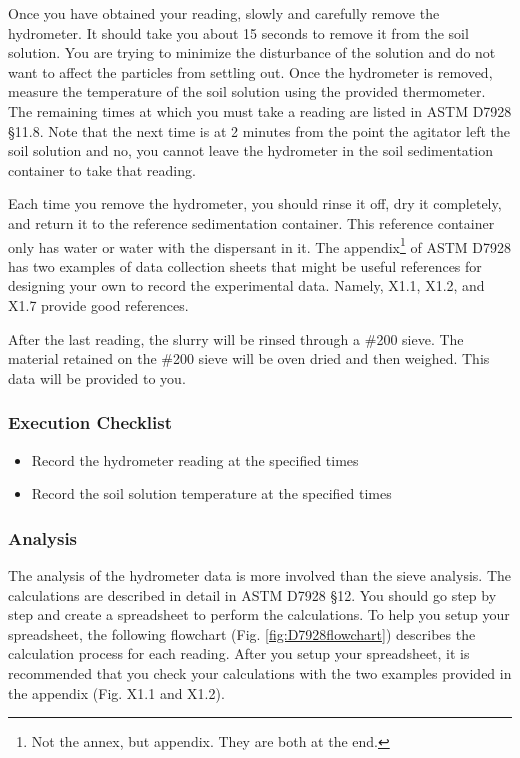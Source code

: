 \documentclass[12pt]{article}
\begin{document}
Once you have obtained your reading, slowly and carefully remove the hydrometer. It should take you about 15 seconds to remove it from the soil solution. You are trying to minimize the disturbance of the solution and do not want to affect the particles from settling out. Once the hydrometer is removed, measure the temperature of the soil solution using the provided thermometer. The remaining times at which you must take a reading are listed in ASTM D7928 \S11.8. Note that the next time is at 2 minutes from the point the agitator left the soil solution and no, you cannot leave the hydrometer in the soil sedimentation container to take that reading.

Each time you remove the hydrometer, you should rinse it off, dry it completely, and return it to the reference sedimentation container. This reference container only has water or water with the dispersant in it. The appendix\footnote{Not the annex, but appendix. They are both at the end.} of ASTM D7928 has two examples of data collection sheets that might be useful references for designing your own to record the experimental data. Namely, X1.1, X1.2, and X1.7 provide good references.

After the last reading, the slurry will be rinsed through a \#200 sieve. The material retained on the \#200 sieve will be oven dried and then weighed. This data will be provided to you.

\subsubsection*{Execution Checklist}
\begin{itemize}
    \item Record the hydrometer reading at the specified times
    \item Record the soil solution temperature at the specified times
\end{itemize}

\subsubsection{Analysis}
The analysis of the hydrometer data is more involved than the sieve analysis. The calculations are described in detail in ASTM D7928 \S12. You should go step by step and create a spreadsheet to perform the calculations. To help you setup your spreadsheet, the following flowchart (Fig. \ref{fig:D7928flowchart}) describes the calculation process for each reading. After you setup your spreadsheet, it is recommended that you check your calculations with the two examples provided in the appendix (Fig. X1.1 and X1.2).
\end{document}
